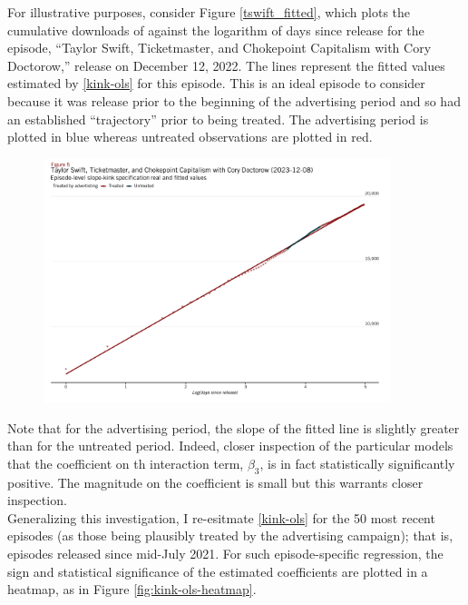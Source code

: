 \documentclass[11pt, letterpaper, twoside]{article}
\begin{document}
For illustrative purposes, consider Figure \ref{tswift_fitted}, which plots the cumulative downloads of against the logarithm of days since release for the episode, ``Taylor Swift, Ticketmaster, and Chokepoint Capitalism with Cory Doctorow,'' release on December 12, 2022. The lines represent the fitted values estimated by \eqref{kink-ols} for this episode. This is an ideal episode to consider because it was release prior to the beginning of the advertising period and so had an established ``trajectory'' prior to being treated. The advertising period is plotted in blue whereas untreated observations are plotted in red.\\
 
\begin{figure}[!htb]
  \centering
  \includegraphics[width=0.9\textwidth]{figures/tswift_daily_kink_plot.png}
  \caption{}
  \label{fig:tswift_fitted}
\end{figure}
  
Note that for the advertising period, the slope of the fitted line is slightly greater than for the untreated period. Indeed, closer inspection of the particular models that the coefficient on th  interaction term, $\beta_3$, is in fact statistically significantly positive. The magnitude on the coefficient is small but this warrants closer inspection.\\

Generalizing this investigation, I re-esitmate \eqref{kink-ols} for the 50 most recent episodes (as those being plausibly treated by the advertising campaign); that is, episodes released since mid-July 2021. For such episode-specific regression, the sign and statistical significance of the estimated coefficients are plotted in a heatmap, as in Figure \ref{fig:kink-ols-heatmap}.\\ 
\end{document}
